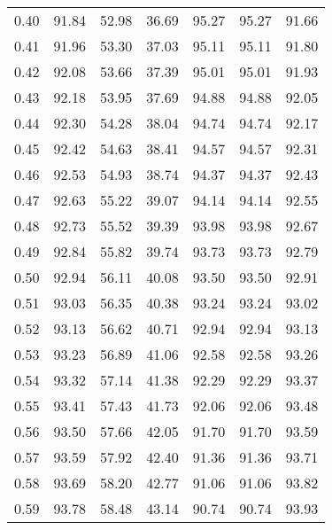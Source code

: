\begin{tabular}{|c|c|c|c|c|c|c|}
      0.40 &     91.84 &     52.98 &      36.69 &   95.27 &      95.27 &         91.66 \\
      0.41 &     91.96 &     53.30 &      37.03 &   95.11 &      95.11 &         91.80 \\
      0.42 &     92.08 &     53.66 &      37.39 &   95.01 &      95.01 &         91.93 \\
      0.43 &     92.18 &     53.95 &      37.69 &   94.88 &      94.88 &         92.05 \\
      0.44 &     92.30 &     54.28 &      38.04 &   94.74 &      94.74 &         92.17 \\
      0.45 &     92.42 &     54.63 &      38.41 &   94.57 &      94.57 &         92.31 \\
      0.46 &     92.53 &     54.93 &      38.74 &   94.37 &      94.37 &         92.43 \\
      0.47 &     92.63 &     55.22 &      39.07 &   94.14 &      94.14 &         92.55 \\
      0.48 &     92.73 &     55.52 &      39.39 &   93.98 &      93.98 &         92.67 \\
      0.49 &     92.84 &     55.82 &      39.74 &   93.73 &      93.73 &         92.79 \\
      0.50 &     92.94 &     56.11 &      40.08 &   93.50 &      93.50 &         92.91 \\
      0.51 &     93.03 &     56.35 &      40.38 &   93.24 &      93.24 &         93.02 \\
      0.52 &     93.13 &     56.62 &      40.71 &   92.94 &      92.94 &         93.13 \\
      0.53 &     93.23 &     56.89 &      41.06 &   92.58 &      92.58 &         93.26 \\
      0.54 &     93.32 &     57.14 &      41.38 &   92.29 &      92.29 &         93.37 \\
      0.55 &     93.41 &     57.43 &      41.73 &   92.06 &      92.06 &         93.48 \\
      0.56 &     93.50 &     57.66 &      42.05 &   91.70 &      91.70 &         93.59 \\
      0.57 &     93.59 &     57.92 &      42.40 &   91.36 &      91.36 &         93.71 \\
      0.58 &     93.69 &     58.20 &      42.77 &   91.06 &      91.06 &         93.82 \\
      0.59 &     93.78 &     58.48 &      43.14 &   90.74 &      90.74 &         93.93 \\

\end{tabular}
